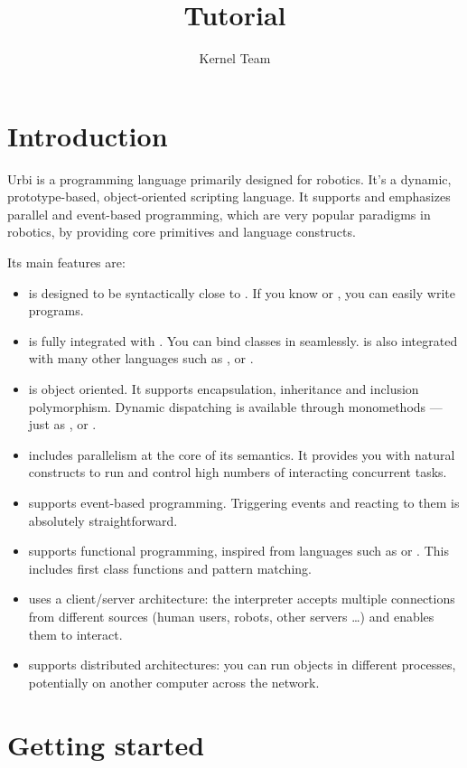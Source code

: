 \documentclass[openright,twoside,12pt]{report}
\title{Tutorial}
\author{Kernel Team}
\begin{document}
\maketitle
\tableofcontents
\chapter{Introduction}

Urbi is a programming language primarily designed for robotics. It's a
dynamic, prototype-based, object-oriented scripting language. It
supports and emphasizes parallel and event-based programming, which
are very popular paradigms in robotics, by providing core primitives
and language constructs.

Its main features are:
\begin{itemize}
\item \urbi is designed to be syntactically close to \Cxx. If you know
  \C or \Cxx, you can easily write \urbi programs.
\item \urbi is fully integrated with \Cxx. You can bind \Cxx classes
  in \urbi seamlessly. \urbi is also integrated with many other
  languages such as \java, \matlab or \python.
\item \urbi is object oriented. It supports encapsulation, inheritance
  and inclusion polymorphism. Dynamic dispatching is available through
  monomethods --- just as \Cxx, \Cs or \java.
\item \urbi includes parallelism at the core of its semantics. It
  provides you with natural constructs to run and control high numbers
  of interacting concurrent tasks.
\item \urbi supports event-based programming. Triggering events and
  reacting to them is absolutely straightforward.
\item \urbi supports functional programming, inspired from languages
  such as \lisp or \caml. This includes first class functions and
  pattern matching.
\item \urbi uses a client/server architecture: the interpreter accepts
  multiple connections from different sources (human users, robots,
  other servers \ldots) and enables them to interact.
\item \urbi supports distributed architectures: you can run objects in
  different processes, potentially on another computer across the
  network.
\end{itemize}

\chapter{Getting started}
\end{document}
